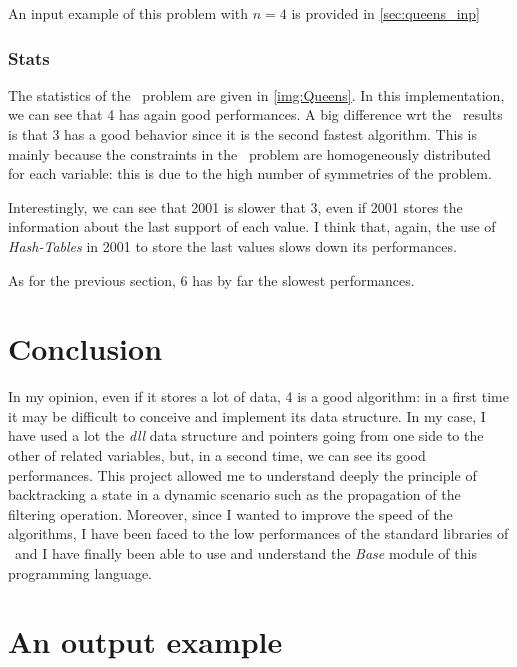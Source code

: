 \documentclass{rapport}
\begin{document}
An input example of this problem with $n = 4$ is provided in \cref{sec:queens_inp}

\subsubsection{Stats}

The statistics of the \queens\ problem are given in \cref{img:Queens}. In this implementation, we can see that \ac{4} has again good performances. A big difference wrt the \allint\ results is that \ac{3} has a good behavior since it is the second fastest algorithm. This is mainly because the constraints in the \queens\ problem are homogeneously distributed for each variable: this is due to the high number of symmetries of the problem.

Interestingly, we can see that \ac{2001} is slower that \ac{3}, even if \ac{2001} stores the information about the last support of each value. I think that, again, the use of \textit{Hash-Tables} in \ac{2001} to store the last values slows down its performances.

As for the previous section, \ac{6} has by far the slowest performances.

\section{Conclusion}

In my opinion, even if it stores a lot of data, \ac{4} is a good algorithm: in a first time it may be difficult to conceive and implement its data structure. In my case, I have used a lot the \textit{dll} data structure and pointers going from one side to the other of related variables, but, in a second time, we can see its good performances. This project allowed me to understand deeply the principle of backtracking a state in a dynamic scenario such as the propagation of the filtering operation. Moreover, since I wanted to improve the speed of the algorithms, I have been faced to the low performances of the standard libraries of \ml\ and I have finally been able to use and understand the \textit{Base} module of this programming language.

\newpage

\appendix

\section{An output example}
\end{document}

